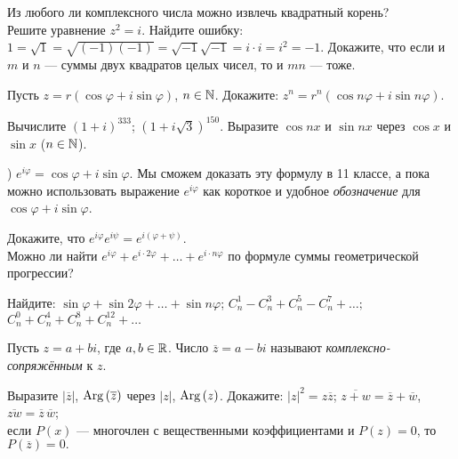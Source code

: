 \documentclass[a4paper,11pt]{article}
\begin{document}
 Из любого ли комплексного числа можно извлечь
квадратный корень? \\
 Решите уравнение $z^2=i$.
 Найдите ошибку: $1=\sqrt 1=\sqrt{(-1)(-1)}=\sqrt{-1}\sqrt{-1}=i\cdot i=i^2=-1$.
Докажите, что если и $m$ и $n$ --- суммы двух квадратов целых чисел, то и $mn$ --- тоже.

 Пусть $z=r(\cos\varphi+i\sin\varphi)$, $n\in\mathbb{N}$.
Докажите: %
$z^n=r^n(\cos n\varphi+i\sin n\varphi)$.

Вычислите  $(1+i)^{333}$;  $(1+i\sqrt{3})^{150}$.
 Выразите $\cos nx$ и $\sin nx$ через $\cos{x}$ и $\sin{x}$ ($n\in\mathbb{N}$).


)
$e^{i\varphi}=\cos\varphi+i\sin\varphi$. Мы сможем доказать эту формулу в 11 классе, а пока  можно использовать выражение $e^{i\varphi}$ как короткое и удобное {\em обозначение} для $\cos\varphi+i\sin\varphi$.

 Докажите, что $e^{i\varphi}e^{i\psi}=e^{i(\varphi+\psi)}$.\\
 Можно ли найти $e^{i\varphi}+e^{i\cdot2\varphi}+\ldots+e^{i\cdot n\varphi}$ по формуле суммы геометрической прогрессии?

Найдите: %
$\sin \varphi +\sin 2\varphi +\ldots +\sin n\varphi$;
$C_{n}^{1}-C_{n}^{3}+C_{n}^{5}-C_{n}^{7}+\dots;$
$C_{n}^{0}+C_{n}^{4}+C_{n}^{8}+C_{n}^{12}+\dots$





Пусть $z=a+bi$, где $a,b\in\mathbb{R}$. Число $\overline{z}=a-bi$ называют
{\em комплексно-сопряжённым\/} к $z$.

 Выразите $|\overline{z}|$, ${\rm Arg}\,(\overline{z})$  через $|z|$, ${\rm Arg}\,(z)$.
%
Докажите:
$|z|^2=z\overline{z}$; %
$\overline{z+w}=\overline{z}+\overline{w}$,
$\overline{zw}=\overline{z}\,\overline{w}$;\\
если $P(x)$ --- многочлен с вещественными коэффициентами и $P(z)=0$, то $P(\overline{z})=0.$
\end{document}

